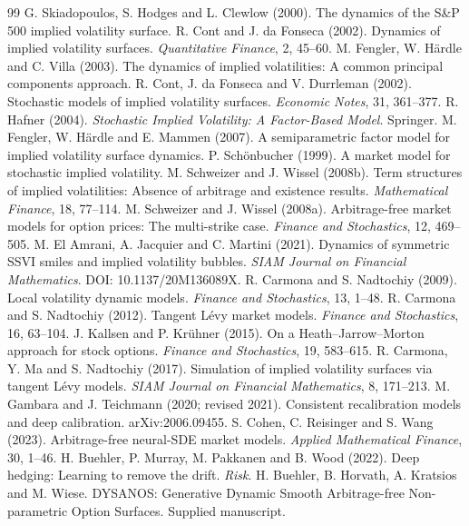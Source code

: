 \clearpage
\begin{thebibliography}{99}
\small
\setlength{\itemsep}{2pt}
 G. Skiadopoulos, S. Hodges and L. Clewlow (2000). The dynamics of the S\&P 500 implied volatility surface.
 R. Cont and J. da Fonseca (2002). Dynamics of implied volatility surfaces. \emph{Quantitative Finance}, 2, 45--60.
 M. Fengler, W. H\"ardle and C. Villa (2003). The dynamics of implied volatilities: A common principal components approach.
 R. Cont, J. da Fonseca and V. Durrleman (2002). Stochastic models of implied volatility surfaces. \emph{Economic Notes}, 31, 361--377.
 R. Hafner (2004). \emph{Stochastic Implied Volatility: A Factor-Based Model}. Springer.
 M. Fengler, W. H\"ardle and E. Mammen (2007). A semiparametric factor model for implied volatility surface dynamics.
 P. Sch\"onbucher (1999). A market model for stochastic implied volatility.
 M. Schweizer and J. Wissel (2008b). Term structures of implied volatilities: Absence of arbitrage and existence results. \emph{Mathematical Finance}, 18, 77--114.
 M. Schweizer and J. Wissel (2008a). Arbitrage-free market models for option prices: The multi-strike case. \emph{Finance and Stochastics}, 12, 469--505.
 M. El Amrani, A. Jacquier and C. Martini (2021). Dynamics of symmetric SSVI smiles and implied volatility bubbles. \emph{SIAM Journal on Financial Mathematics}. DOI: 10.1137/20M136089X.
 R. Carmona and S. Nadtochiy (2009). Local volatility dynamic models. \emph{Finance and Stochastics}, 13, 1--48.
 R. Carmona and S. Nadtochiy (2012). Tangent L\'evy market models. \emph{Finance and Stochastics}, 16, 63--104.
 J. Kallsen and P. Kr\"uhner (2015). On a Heath--Jarrow--Morton approach for stock options. \emph{Finance and Stochastics}, 19, 583--615.
 R. Carmona, Y. Ma and S. Nadtochiy (2017). Simulation of implied volatility surfaces via tangent L\'evy models. \emph{SIAM Journal on Financial Mathematics}, 8, 171--213.
 M. Gambara and J. Teichmann (2020; revised 2021). Consistent recalibration models and deep calibration. arXiv:2006.09455.
 S. Cohen, C. Reisinger and S. Wang (2023). Arbitrage-free neural-SDE market models. \emph{Applied Mathematical Finance}, 30, 1--46.
 H. Buehler, P. Murray, M. Pakkanen and B. Wood (2022). Deep hedging: Learning to remove the drift. \emph{Risk}.
 H. Buehler, B. Horvath, A. Kratsios and M. Wiese. DYSANOS: Generative Dynamic Smooth Arbitrage-free Non-parametric Option Surfaces. Supplied manuscript.

\end{thebibliography}
